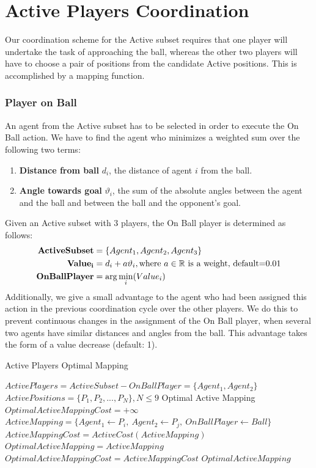 \section{Active Players Coordination}
\label{sec:ActiveCoordination}
Our coordination scheme for the Active subset requires that one player will undertake the task of approaching the ball, whereas the other two players will have to choose a pair of positions from the candidate Active positions.  This is accomplished by a mapping function.  

\subsubsection*{Player on Ball}
An agent from the Active subset has to be selected in order to execute the On Ball action. We have to find the agent who minimizes a weighted sum over the following two terms:
\begin{enumerate}
\item \textbf{Distance from ball} $d_{i}$, the distance of agent $i$ from the ball. 
\item \textbf{Angle towards goal} $\vartheta_{i}$, the sum of the absolute angles between the agent and the ball and between the ball and the opponent's goal.
\end{enumerate}
Given an Active subset with 3 players, the On Ball player is determined as follows:
\begin{align*}
{\bf ActiveSubset} &= \lbrace Agent_{1},Agent_{2},Agent_{3} \rbrace  \\
{\bf Value_{i}} &= d_{i} + a \vartheta_{i}, \text{where $a\in\mathbb{R}$ is a weight, default=$0.01$} \\
{\bf OnBallPlayer} &= \arg\min_{i}(Value_{i})
\end{align*}
Additionally, we give a small advantage to the agent who had been assigned this action in the previous coordination cycle over the other players. We do this to prevent continuous changes in the assignment of the On Ball player, when several two agents have similar distances and angles from the ball. This advantage takes the form of a value decrease (default: 1).


\begin{algorithm}[t!]
\caption{Active Players Optimal Mapping}
\label{ActiveMapping}
\begin{algorithmic}[1]
$ActivePlayers = ActiveSubset - OnBallPlayer = \{Agent_1,Agent_2\}$
$ActivePositions = \lbrace P_{1},P_{2},...,P_{N} \rbrace, N\leq 9 $
Optimal Active Mapping
\STATE 
\STATE $OptimalActiveMappingCost = +\infty$
\STATE $ActiveMapping = \{Agent_1 \leftarrow P_i,\ Agent_2 \leftarrow P_j,\ OnBallPlayer \leftarrow Ball\}$
\STATE $ActiveMappingCost = ActiveCost(ActiveMapping)$
\STATE $OptimalActiveMapping = ActiveMapping$
\STATE $OptimalActiveMappingCost = ActiveMappingCost$
\ENDIF
\ENDFOR
\RETURN $OptimalActiveMapping$
\end{algorithmic}
\end{algorithm}




